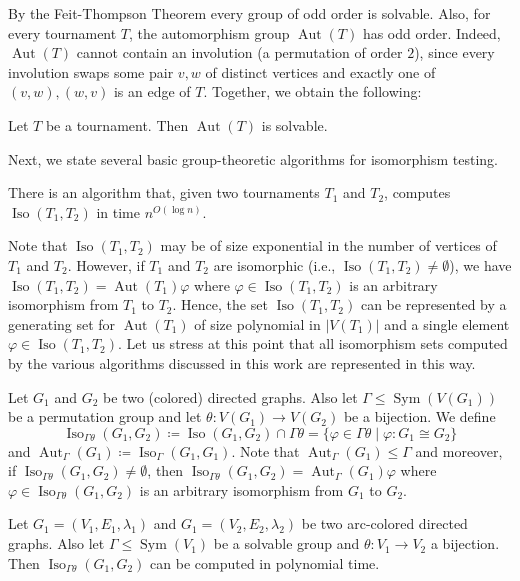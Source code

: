 \documentclass{theoretics}
\DeclareMathOperator{\Aut}{Aut}
\DeclareMathOperator{\Iso}{Iso}
\DeclareMathOperator{\Sym}{Sym}
\begin{document}
By the Feit-Thompson Theorem every group of odd order is solvable.
Also, for every tournament $T$, the automorphism group $\Aut(T)$ has odd order.
Indeed, $\Aut(T)$ cannot contain an involution (a permutation of order $2$), since every involution swaps some pair $v,w$ of distinct vertices and exactly one of $(v,w), (w,v)$ is an edge of $T$.
Together, we obtain the following:

\begin{theorem}
 \label{thm:aut-solvable}
 Let $T$ be a tournament.
 Then $\Aut(T)$ is solvable.
\end{theorem}

Next, we state several basic group-theoretic algorithms for isomorphism testing.

\begin{theorem}
 \label{thm:ti}
 There is an algorithm that, given two tournaments $T_1$ and $T_2$, computes $\Iso(T_1,T_2)$ in time $n^{O(\log n)}$.
\end{theorem}

Note that $\Iso(T_1,T_2)$ may be of size exponential in the number of vertices of $T_1$ and $T_2$.
However, if $T_1$ and $T_2$ are isomorphic (i.e., $\Iso(T_1,T_2) \neq \emptyset$), we have $\Iso(T_1,T_2) = \Aut(T_1) \varphi$ where $\varphi \in \Iso(T_1,T_2)$ is an arbitrary isomorphism from $T_1$ to $T_2$.
Hence, the set $\Iso(T_1,T_2)$ can be represented by a generating set for $\Aut(T_1)$ of size polynomial in $|V(T_1)|$ and a single element $\varphi \in \Iso(T_1,T_2)$.
Let us stress at this point that all isomorphism sets computed by the various algorithms discussed in this work are represented in this way.

Let $G_1$ and $G_2$ be two (colored) directed graphs.
Also let $\Gamma \leq \Sym(V(G_1))$ be a permutation group and let $\theta\colon V(G_1) \to V(G_2)$ be a bijection.
We define
\[\Iso_{\Gamma\theta}(G_1,G_2) \coloneqq \Iso(G_1,G_2) \cap \Gamma\theta = \{\varphi \in \Gamma\theta \mid \varphi\colon G_1 \cong G_2\}\]
and $\Aut_\Gamma(G_1) \coloneqq \Iso_\Gamma(G_1,G_1)$.
Note that $\Aut_\Gamma(G_1) \leq \Gamma$ and moreover, if $\Iso_{\Gamma\theta}(G_1,G_2) \neq \emptyset$, then $\Iso_{\Gamma\theta}(G_1,G_2) = \Aut_\Gamma(G_1)\varphi$ where $\varphi \in \Iso_{\Gamma\theta}(G_1,G_2)$ is an arbitrary isomorphism from $G_1$ to $G_2$.

\begin{theorem}
 \label{thm:gi-solvable-group}
 Let $G_1 = (V_1,E_1,\lambda_1)$ and $G_1 = (V_2,E_2,\lambda_2)$ be two arc-colored directed graphs.
 Also let $\Gamma \leq \Sym(V_1)$ be a solvable group and $\theta\colon V_1 \to V_2$ a bijection.
 Then $\Iso_{\Gamma\theta}(G_1,G_2)$ can be computed in polynomial time.
\end{theorem}
\end{document}
